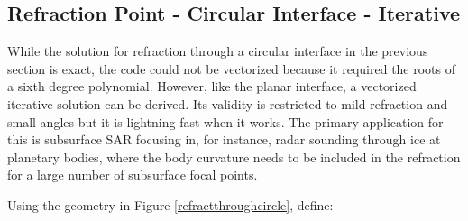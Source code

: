%
%
%


\subsection{Refraction Point - Circular Interface - Iterative}

\label{sec:refractit}
While the solution for refraction through a circular interface in the previous section is exact, the code could not be vectorized because it required the roots of a sixth degree polynomial. However, like the planar interface, a vectorized iterative solution can be derived. Its validity is restricted to mild refraction and small angles but it is lightning fast when it works. The primary application for this is subsurface SAR focusing in, for instance, radar sounding through ice at planetary bodies, where the body curvature needs to be included in the refraction for a large number of subsurface focal points.  

Using the geometry in Figure \ref{refractthroughcircle}, define:

